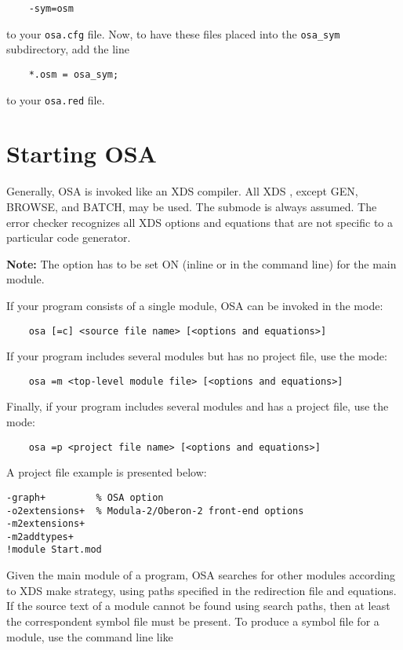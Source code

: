 \verb'    -sym=osm'

to your \verb'osa.cfg' file. Now, to have these files placed
into the \verb'osa_sym' subdirectory, add  the line

\verb'    *.osm = osa_sym;' 

to your \verb'osa.red' file.


\section{Starting OSA}
\label{osa:start}

Generally, OSA is invoked like an XDS compiler. All XDS
, except GEN, BROWSE, and BATCH,
may be used. The  submode is always assumed.
The error checker recognizes all XDS options and equations that are
not specific to a particular code generator.

{\bf Note:} The option  has to be set ON (inline or in the 
command line) for the main \ot{} module.

If your program consists of a single module, OSA can be invoked 
in the  mode:

\verb'    osa [=c] <source file name> [<options and equations>]'

If your program includes several modules but has no
project file, use the  mode:

\verb'    osa =m <top-level module file> [<options and equations>]'

Finally, if your program includes several modules and has a
project file, use the  mode:

\verb'    osa =p <project file name> [<options and equations>]'

A project file example is presented below:

\begin{verbatim}
-graph+         % OSA option
-o2extensions+  % Modula-2/Oberon-2 front-end options
-m2extensions+
-m2addtypes+
!module Start.mod
\end{verbatim}

Given the main module of a program, OSA searches for other
modules according to XDS make strategy, using paths specified
in the redirection file and  equations. 
If the source text of a module cannot be found using search
paths, then at least the correspondent symbol file 
must be present. To produce a symbol file for a module, 
use the command line like

